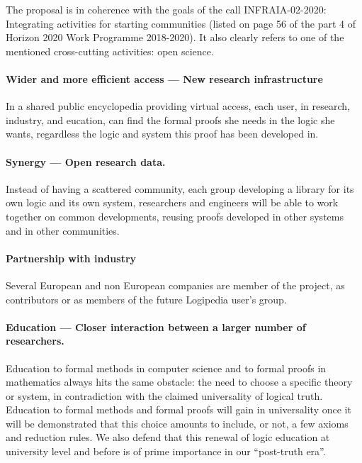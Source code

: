 The proposal is in coherence with the goals of the call INFRAIA-02-2020:
Integrating activities for starting communities (listed on page 56 of
the part 4 of Horizon 2020 Work Programme 2018-2020). It also clearly
refers to one of the mentioned cross-cutting activities: open science.

\paragraph{Wider and more efficient access --- New research infrastructure}
In a shared public encyclopedia providing virtual access, each user,
in research, industry, and eucation, can find the formal proofs she
needs in the logic she wants, regardless the logic and system this
proof has been developed in.

\paragraph{Synergy --- Open research data.}
Instead of having a scattered community, each group developing a
library for its own logic and its own system, researchers and
engineers will be able to work together on common developments,
reusing proofs developed in other systems and in other communities.


\paragraph{Partnership with industry}

Several European and non European companies are member of the project,
as contributors or as members of the future {\sc Logipedia} user's group.

\paragraph{Education --- Closer interaction between a larger number of
researchers.}
Education to formal methods in computer science and to formal proofs
in mathematics always hits the same obstacle: the need to choose a
specific theory or system, in contradiction with the claimed
universality of logical truth. Education to formal methods and formal
proofs will gain in universality once it will be demonstrated that
this choice amounts to include, or not, a few axioms and reduction
rules. We also defend that this renewal of logic education at
university level and before is of prime importance in our ``post-truth
era''.

